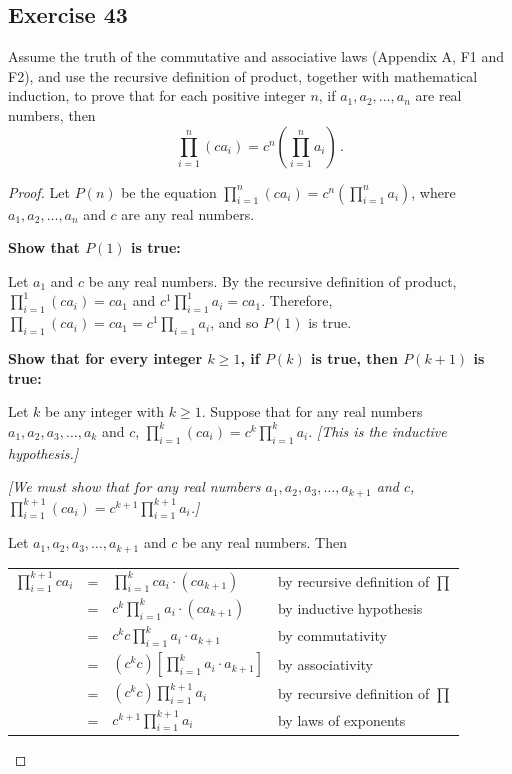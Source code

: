 \documentclass[14pt]{extarticle}
\newcommand{\dps}{\displaystyle}
\newcommand{\cy}{\color{cyan}}
\begin{document}
\subsection{Exercise 43}
Assume the truth of the commutative and associative laws (Appendix A, F1 and F2), and use the recursive definition 
of product, together with mathematical induction, to prove that for each positive integer $n$, if $a_1, a_2, \ldots, 
a_n$ are real numbers, then
\[
\prod_{i = 1}^{n}(ca_i) = c^n \left(\prod_{i = 1}^{n} a_i \right) \,.
\]
\begin{proof}
Let $P(n)$ be the equation \(\dps \prod_{i = 1}^{n}(ca_i) = c^n \left(\prod_{i = 1}^{n} a_i \right)\), where 
\(a_1, a_2, \ldots, a_n\) and $c$ are any real numbers.

{\bf Show that $P(1)$ is true:}

Let $a_1$ and $c$ be any real numbers. By the recursive
definition of product, 
\(\dps \prod_{i=1}^1 (c a_i) = c a_1\) and \(\dps c^1 \prod_{i=1}^1 a_i = c a_1\). 
Therefore, \(\dps \prod_{i=1} (c a_i) = c a_1 = c^1 \prod_{i=1} a_i\), and so $P(1)$ is true.

{\bf Show that for every integer \(k \geq 1\), if $P(k)$ is true, then \(P(k + 1)\) is true:}

Let $k$ be any integer with \(k \geq 1\). Suppose that for any real numbers \(a_1, a_2, a_3, \ldots, a_k\) and $c$, 
\(\dps \prod_{i=1}^k (c a_i) = c^k \prod_{i=1}^k a_i\). {\it [This is the inductive hypothesis.]}

{\it [We must show that for any real numbers \(a_1, a_2, a_3, \ldots, a_{k+1}\) and $c$, \(\dps \prod_{i=1}^{k+1} 
(c a_i) = c^{k+1} \prod_{i=1}^{k+1} a_i\).]}

Let \(a_1, a_2, a_3, \ldots, a_{k+1}\) and $c$ be any real numbers. Then

\begin{center}
\begin{tabular}{rcll}
\(\dps \prod_{i=1}^{k+1} c a_i\) & = & \(\dps \prod_{i=1}^k c a_i \cdot (c a_{k+1})\) & {\cy by recursive definition of $\prod$} \\
& = & \(\dps c^k \prod_{i=1}^k a_i \cdot (c a_{k+1})\) & {\cy by inductive hypothesis} \\
& = & \(\dps c^k c \prod_{i=1}^k a_i \cdot a_{k+1}\) & {\cy by commutativity} \\
& = & \(\dps (c^k c) \left[\prod_{i=1}^k a_i \cdot a_{k+1}\right]\) & {\cy by associativity} \\
& = & \(\dps (c^k c) \prod_{i=1}^{k+1} a_i\) & {\cy by recursive definition of $\prod$} \\
& = & \(\dps c^{k+1} \prod_{i=1}^{k+1} a_i\) & {\cy by laws of exponents}
\end{tabular}
\end{center}
\end{proof}
\end{document}
